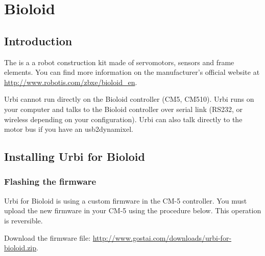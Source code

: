 
\chapter{Bioloid}
\label{sec:bioloid}

\section{Introduction}

The  is a a robot construction kit made of servomotors, sensors
and frame elements. You can find more information on the manufacturer's
official website at \url{http://www.robotis.com/zbxe/bioloid_en}.

Urbi cannot run directly on the Bioloid controller (CM5, CM510). Urbi runs
on your computer and talks to the Bioloid controller over serial link
(RS232, or wireless depending on your configuration). Urbi can also talk
directly to the motor bus if you have an usb2dynamixel.

\section{Installing Urbi for Bioloid}

\subsection{Flashing the firmware}

Urbi for Bioloid is using a custom firmware in the CM-5 controller. You must
upload the new firmware in your CM-5 using the procedure below. This
operation is reversible.

Download the firmware file:
\url{http://www.gostai.com/downloads/urbi-for-bioloid.zip}.

